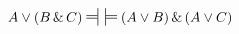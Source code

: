 \begin{earg}

\item $A \eor (B \eand C)\ndststile{}{} \hspace{.5em} \sdtstile{}{} (A \eor B) \eand (A \eor C)$\vspace{.5ex} %


\end{earg}
